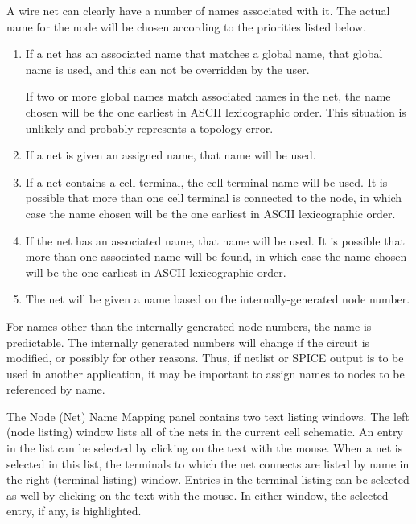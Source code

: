 A wire net can clearly have a number of names associated with it.  The
actual name for the node will be chosen according to the priorities
listed below.

\begin{enumerate}
\item{If a net has an associated name that matches a global name, that
global name is used, and this can not be overridden by the user.

If two or more global names match associated names in the net, the
name chosen will be the one earliest in ASCII lexicographic order. 
This situation is unlikely and probably represents a topology error.}

\item{If a net is given an assigned name, that name will be used.}

\item{If a net contains a cell terminal, the cell terminal name will
be used.  It is possible that more than one cell terminal is connected
to the node, in which case the name chosen will be the one earliest in
ASCII lexicographic order.}

\item{If the net has an associated name, that name will be used.  It
is possible that more than one associated name will be found, in which
case the name chosen will be the one earliest in ASCII lexicographic
order.}

\item{The net will be given a name based on the internally-generated
node number.}
\end{enumerate}

For names other than the internally generated node numbers, the name
is predictable.  The internally generated numbers will change if the
circuit is modified, or possibly for other reasons.  Thus, if netlist
or SPICE output is to be used in another application, it may be
important to assign names to nodes to be referenced by name.

The {\cb Node (Net) Name Mapping} panel contains two text listing
windows.  The left (node listing) window lists all of the nets in the
current cell schematic.  An entry in the list can be selected by
clicking on the text with the mouse.  When a net is selected in this
list, the terminals to which the net connects are listed by name in
the right (terminal listing) window.  Entries in the terminal listing
can be selected as well by clicking on the text with the mouse.  In
either window, the selected entry, if any, is highlighted. 

